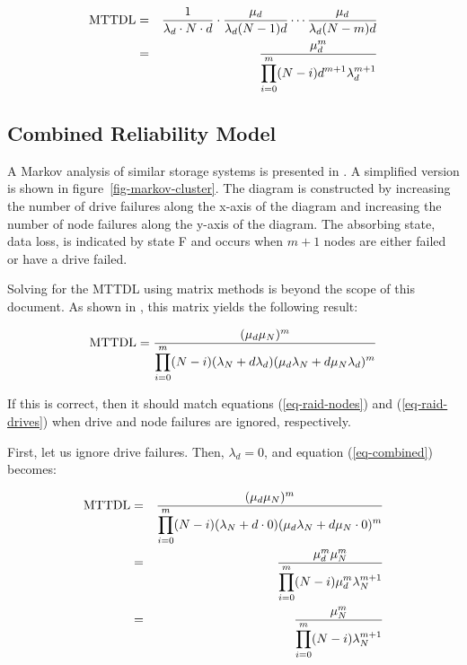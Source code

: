 \documentclass[11pt]{article}
\newcommand{\mttdl}{{\rm MTTDL}}
\numberwithin{equation}{section}
\begin{document}
\begin{eqnarray}
\mttdl & = & 
\frac{1}{\lambda_{d} \cdot N \cdot d} \cdot 
\frac{\mu_{d}}{\lambda_{d} (N-1)d} \cdots \frac{\mu_{d}}{\lambda_{d} (N-m)d} 
\\
& = & \frac{\mu_{d}^{m}}
{\displaystyle \prod_{i=0}^{m}(N - i)d^{m+1}\lambda_{d}^{m+1}}
\label{eq-raid-drives}
\end{eqnarray}

\subsection{Combined Reliability Model}

A Markov analysis of similar storage systems is presented in \cite{ibm}.  A
simplified version is shown in figure~\ref{fig-markov-cluster}.  The diagram
is constructed by increasing the number of drive failures along the x-axis of
the diagram and increasing the number of node failures along the y-axis of the
diagram.  The absorbing state, data loss, is indicated by state F and occurs
when $m+1$ nodes are either failed or have a drive failed.

Solving for the MTTDL using matrix methods is beyond the scope of this
document.  As shown in \cite{ibm}, this matrix yields the following result:

\begin{equation}
\mttdl = \frac{(\mu_{d}\mu_{N})^{m}}
{\displaystyle \prod_{i=0}^{m} 
(N - i)(\lambda_{N} + d\lambda_{d})
(\mu_{d}\lambda_{N} + d\mu_{N}\lambda_{d})^{m}}
\label{eq-combined}
\end{equation}

If this is correct, then it should match equations (\ref{eq-raid-nodes}) and
(\ref{eq-raid-drives}) when drive and node failures are ignored, respectively.

First, let us ignore drive failures.  Then, $\lambda_{d} = 0$, and equation
(\ref{eq-combined}) becomes:

\begin{eqnarray}
\mttdl & = & \frac{(\mu_{d}\mu_{N})^{m}}
{\displaystyle \prod_{i=0}^{m} 
(N - i)(\lambda_{N} + d\cdot 0)
(\mu_{d}\lambda_{N} + d \mu_{N} \cdot 0)^{m}}
\\
& = & \frac{\mu_{d}^{m}\mu_{N}^{m}}
{\displaystyle \prod_{i=0}^{m} 
(N - i)
\mu_{d}^{m}\lambda_{N}^{m+1}}
\\
& = & \frac{\mu_{N}^{m}}
{\displaystyle \prod_{i=0}^{m} 
(N - i)
\lambda_{N}^{m+1}}
\end{eqnarray}
\end{document}
